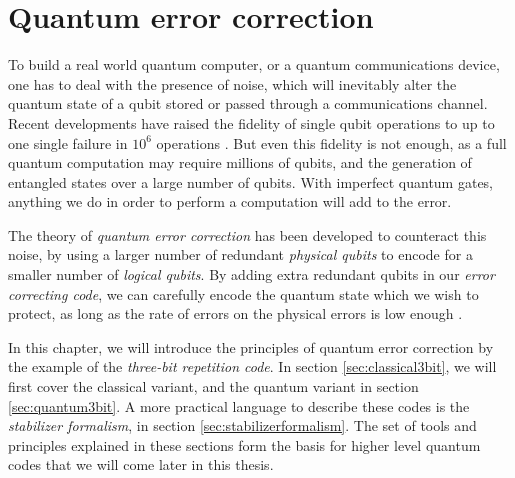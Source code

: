 \chapter{Quantum error correction}

To build a real world quantum computer, or a quantum communications device, one has to deal with the presence of noise, which will inevitably alter the quantum state of a qubit stored or passed through a communications channel. Recent developments have raised the fidelity of single qubit operations to up to one single failure in $10^6$ operations \cite{ballance2016high}. But even this fidelity is not enough, as a full quantum computation may require millions of qubits, and the generation of entangled states over a large number of qubits. With imperfect quantum gates, anything we do in order to perform a computation will add to the error. 

The theory of \emph{quantum error correction} has been developed to counteract this noise, by using a larger number of redundant \emph{physical qubits} to encode for a smaller number of \emph{logical qubits}. By adding extra redundant qubits in our \emph{error correcting code}, we can carefully encode the quantum state which we wish to protect, as long as the rate of errors on the physical errors is low enough \cite{calderbank1996good, steane1996multiple, preskill1998reliable}.

In this chapter, we will introduce the principles of quantum error correction by the example of the \emph{three-bit repetition code}. In section \ref{sec:classical3bit}, we will first cover the classical variant, and the quantum variant in section \ref{sec:quantum3bit}. A more practical language to describe these codes is the \emph{stabilizer formalism}, in section \ref{sec:stabilizerformalism}. The set of tools and principles explained in these sections form the basis for higher level quantum codes that we will come later in this thesis.

